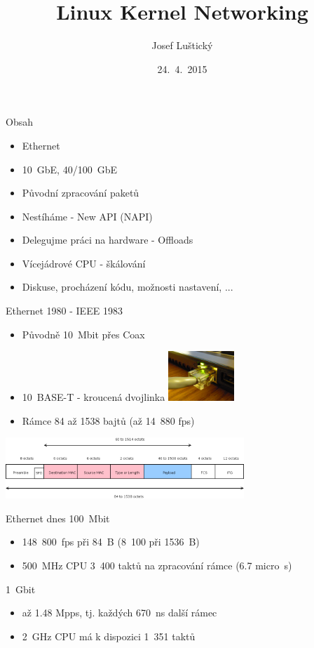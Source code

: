 \documentclass{beamer}
\title{Linux Kernel Networking}
\author{Josef Luštický}
\institute{iXperta s.r.o}
\date{24.~4.~2015}
\begin{document}
\begin{frame}
  \titlepage
\end{frame}

\expandafter\def\expandafter\insertshorttitle\expandafter{%
  \insertshorttitle\hfill%
  \insertframenumber\,/\,\inserttotalframenumber}

\addtocounter{framenumber}{-1}

\begin{frame}{Obsah}
	\begin{itemize}
		\item Ethernet
		\item 10~GbE, 40/100~GbE
		\item Původní zpracování paketů
		\item Nestíháme - New API (NAPI)
		\item Delegujme práci na hardware - Offloads
		\item Vícejádrové CPU - škálování
		\item Diskuse, procházení kódu, možnosti nastavení, ...
	\end{itemize}
\end{frame}

\begin{frame}{Ethernet 1980 - IEEE 1983}
	\begin{itemize}
		\item Původně 10~Mbit přes Coax
		\item 10~BASE-T - kroucená dvojlinka
			\includegraphics[width=2.5cm,keepaspectratio]{fig/rj45.jpg}
		\item Rámce 84 až 1538 bajtů (až 14~880 fps)
	\end{itemize}
	\centering
	\includegraphics[width=9cm,keepaspectratio]{fig/ethernet-frame.png}
\end{frame}

\begin{frame}{Ethernet dnes}
	100~Mbit
	\begin{itemize}
		\item 148~800~fps při 84~B (8~100 při 1536~B)
		\item 500~MHz CPU 3~400 taktů na zpracování rámce (6.7 micro~s)
	\end{itemize}
	1~Gbit
	\begin{itemize}
		\item až 1.48 Mpps, tj. každých 670~ns další rámec
		\item 2~GHz CPU má k dispozici 1~351 taktů
	\end{itemize}
\end{frame}
\end{document}
